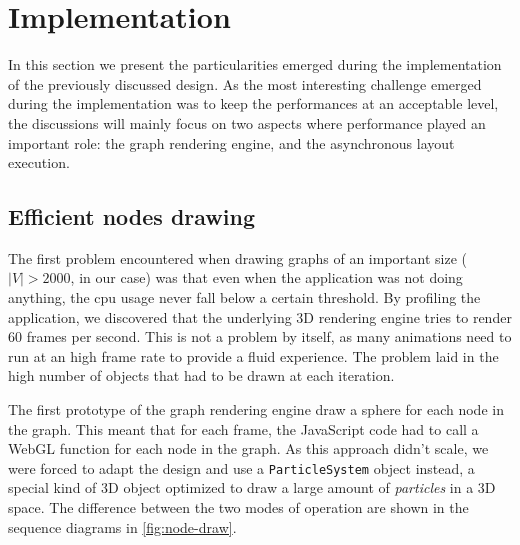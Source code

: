 \section{Implementation}
\label{sec:visu/implementation}

In this section we present the particularities emerged during the implementation of the previously discussed design. As the most interesting challenge emerged during the implementation was to keep the performances at an acceptable level, the discussions will mainly focus on two aspects where performance played an important role: the graph rendering engine, and the asynchronous layout execution.

\subsection{Efficient nodes drawing}

The first problem encountered when drawing graphs of an important size ($|V| > 2000$, in our case) was that even when the application was not doing anything, the \gls{cpu} usage never fall below a certain threshold. By profiling the application, we discovered that the underlying 3D rendering engine tries to render 60 frames per second. This is not a problem by itself, as many animations need to run at an high frame rate to provide a fluid experience. The problem laid in the high number of objects that had to be drawn at each iteration.

The first prototype of the graph rendering engine draw a sphere for each node in the graph. This meant that for each frame, the JavaScript code had to call a WebGL function for each node in the graph. As this approach didn't scale, we were forced to adapt the design and use a \texttt{ParticleSystem} object instead, a special kind of 3D object optimized to draw a large amount of \emph{particles} in a 3D space. The difference between the two modes of operation are shown in the sequence diagrams in \vref{fig:node-draw}.

